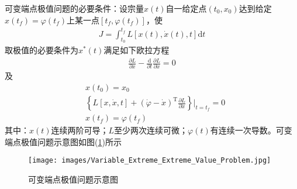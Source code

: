             \par
            可变端点极值问题的必要条件：设宗量$x(t)$自一给定点$(t_0,x_0)$达到给定$x(t_f) = \varphi(t_f)$上某一点$[t_f,\varphi(t_f)]$，使
            \begin{align*}
            J = \int_{t_0}^{t_f} L[x(t),\dot{x}(t),t]\mathrm{d}t
            \end{align*}
            取极值的必要条件为$x^*(t)$满足如下欧拉方程
            \begin{align*}
            \frac{\partial L}{\partial x} - \frac{\mathrm{d} }{\partial t}\frac{\partial L}{\partial \dot{x}} = 0
            \end{align*}
            及
            \begin{align*}
            & x(t_0) = x_0\\
            & \left\{L[x,\dot{x},t]+(\dot{\varphi}-\dot{x})^\mathrm{T}\frac{\partial L}{\partial \dot{x}}  \right\}\Big|_{t=t_f}=0\\
            & x(t_f) = \varphi(t_f)
            \end{align*}
            其中：$x(t)$连续两阶可导；$L$至少两次连续可微；$\varphi(t)$有连续一次导数。可变端点极值问题示意图如图(\ref{fig:可变端点极值问题示意图})所示
            \begin{figure}[H]
            \centering
            \texttt{[image: images/Variable\_Extreme\_Extreme\_Value\_Problem.jpg]}
            \caption{可变端点极值问题示意图}
            \label{fig:可变端点极值问题示意图}
            \end{figure}
